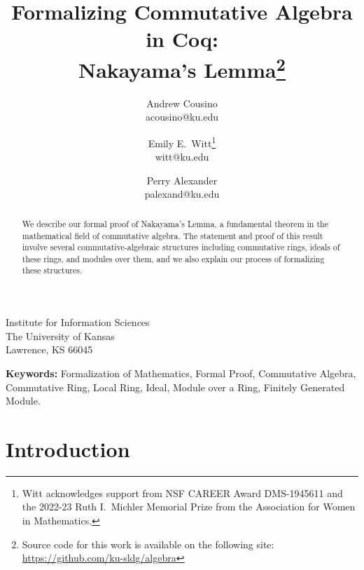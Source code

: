 \documentclass{article}
\begin{document}



\title{ 
Formalizing Commutative Algebra in Coq: \\ Nakayama's Lemma\thanks{Source code for this work is available on the following site: \url{https://github.com/ku-sldg/algebra}}
}


\date{}

\author{ 
	Andrew Cousino \\ {\ttfamily acousino@ku.edu}
	\and 
	Emily E.\ Witt\thanks{Witt acknowledges support from NSF CAREER Award DMS-1945611 and the 2022-23 Ruth I.\, Michler Memorial Prize from the Association for Women in Mathematics.}
 \\ {\ttfamily witt@ku.edu} \and 
	Perry Alexander \\ {\ttfamily palexand@ku.edu}
}	
	
\maketitle	

\vspace{-1cm}

{\large
\begin{center}
	Institute for Information Sciences \\
	The University of Kansas \\
	Lawrence, KS 66045
\end{center}
}



\begin{abstract}
We describe our formal proof of Nakayama's Lemma, a fundamental theorem in the mathematical field of commutative algebra. The statement and proof of this result involve several commutative-algebraic structures including commutative rings, ideals of these rings, and modules over them, and we also explain our process of formalizing these structures. 
\end{abstract}

\noindent \textbf{Keywords:}
Formalization of Mathematics,
Formal Proof,
Commutative Algebra,
Commutative Ring,
Local Ring,
Ideal,
Module over a Ring,
Finitely Generated Module. 


\section{Introduction}
\end{document}
